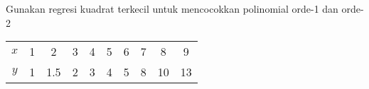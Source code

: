 \begin{soal}
Gunakan regresi kuadrat terkecil untuk mencocokkan polinomial
orde-1 dan orde-2

{\centering
\begin{tabular}{|c|ccccccccc|}
\hline
$x$ & 1 & 2 & 3 & 4 & 5 & 6 & 7 & 8 & 9 \\
$y$ & 1 & 1.5 & 2 & 3 & 4 & 5 & 8 & 10 & 13 \\
\hline
\end{tabular}
\par}
\end{soal}